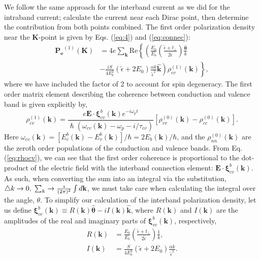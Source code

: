 \documentclass[twocolumn,secnumarabic,amssymb, nobibnotes, aps, prd, superscriptaddress]{revtex4-1}
\begin{document}
We follow the same approach for the interband current as we did for the intraband current; calculate the current near each Dirac point, then determine the contribution from both points combined. The first order polarization density near the $\mathbf{K}$-point is given by Eqs. (\ref{eq:4}) and (\ref{eq:connec}):
\begin{equation}
\begin{aligned}\mathbf{P_{e}}^{(1)}(\mathbf{K}) & =4e\sum_{\mathbf{k}}\textrm{Re}\left\{ \left(\frac{E_{0}}{E_{b}}\left(\frac{\tilde{\epsilon}+t_{\perp}}{2\tilde{\epsilon}}\right)\frac{\hat{\mathbf{\theta}}}{k}\right.\right.\\
 & -\left.\left.\frac{iS}{4E_{b}^{2}}\left(\tilde{\epsilon}+2E_{0}\right)\frac{\alpha k}{\tilde{\epsilon}^2}\hat{\mathbf{k}}\right)\rho_{cv}^{(1)}(\mathbf{k})\right\},\label{eq:polar} 
\end{aligned}
\end{equation} 
where we have included the factor of 2 to account for spin degeneracy. The first order matrix element describing the coherence between conduction and valence band is given explicitly by,
\begin{equation}
\rho_{cv}^{\left(1\right)}\left(\mathbf{k}\right)=\frac{e\mathbf{E}\cdot\mathbf{\xi}_{cv}^{b}(\mathbf{k})e^{-i\omega_{p}t}}{\hslash\left(\omega_{cv}(\mathbf{k})-\omega_{p}-i/\tau_{cv}\right)}\left[\rho_{vv}^{\left(0\right)}\left(\mathbf{k}\right)-\rho_{cc}^{(0)}(\mathbf{k})\right].\label{eq:rhocv}
\end{equation}
Here $\omega_{cv}(\mathbf{k})=[E_{c}^{b}(\mathbf{k})-E_{v}^{b}(\mathbf{k})]/\hbar=2E_{b}(\mathbf{k})/\hbar$, and the $\rho_{nn}^{(0)}(\mathbf{k})$ are the zeroth order populations of the conduction and valence bands. From Eq. (\ref{eq:rhocv}), we can see that the first order coherence is proportional to the dot-product of the electric field with the interband connection element: $\mathbf{E}\cdot\mathbf{\xi}_{cv}^{b}(\mathbf{k})$. As such, when converting the sum into an integral via the substitution, $\triangle k\rightarrow0,\;\sum_{k}\rightarrow\frac{\mathnormal{1}}{(2\pi)^{2}}\int d\mathbf{k}$, we must take care when calculating the integral over the angle, $\theta$. To simplify our calculation of the interband polarization density, let us define $\mathbf{\xi}_{vc}^{b}(\mathbf{k})\equiv R(\mathbf{k})\hat{\mathbf{\theta}}-iI(\mathbf{k})\hat{\mathbf{k}}$, where $R(\mathbf{k})$ and $I(\mathbf{k})$ are the amplitudes of the real and imaginary parts of $\mathbf{\xi}_{vc}^{b}(\mathbf{k})$, respectively, 
\begin{equation}
\begin{aligned}R(\mathbf{k}) & =\frac{E_{0}}{E_{b}}\left(\frac{\tilde{\epsilon}+t_{\perp}}{2\tilde{\epsilon}}\right)\frac{1}{k},\\
I(\mathbf{k}) & =\frac{S}{4E_{b}^{2}}\left(\tilde{\epsilon}+2E_{0}\right)\frac{\alpha k}{\tilde{\epsilon}^2}.
\end{aligned}
\end{equation}
\end{document}
